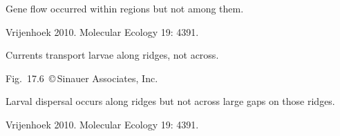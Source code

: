 \documentclass[t]{beamer}
\begin{document}
{
\begin{frame}[b]{Gene flow occurred within regions but not among them.}

\hfill \tiny Vrijenhoek 2010. Molecular Ecology 19: 4391.
\end{frame}
}
%
{
\begin{frame}[b]{Currents transport larvae along ridges, not across.}

\hfill \tiny Fig.~17.6~\copyright\,Sinauer Associates, Inc.
\end{frame}
}
%

{
\begin{frame}[b]{Larval dispersal occurs along ridges but not across large gaps on those ridges.}

\hfill \tiny Vrijenhoek 2010. Molecular Ecology 19: 4391.
\end{frame}
}
%
\end{document}
